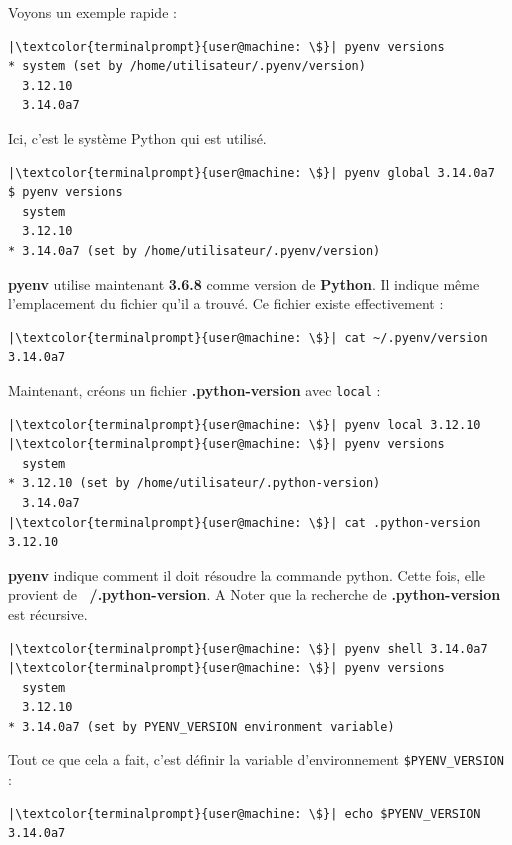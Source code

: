 Voyons un exemple rapide :
\begin{lstlisting}[style=terminal]
|\textcolor{terminalprompt}{user@machine: \$}| pyenv versions
* system (set by /home/utilisateur/.pyenv/version)
  3.12.10
  3.14.0a7
\end{lstlisting}

Ici, c'est le système Python qui est utilisé.
\begin{lstlisting}[style=terminal]
|\textcolor{terminalprompt}{user@machine: \$}| pyenv global 3.14.0a7
$ pyenv versions
  system
  3.12.10
* 3.14.0a7 (set by /home/utilisateur/.pyenv/version)
\end{lstlisting}

\textbf{pyenv} utilise maintenant \textbf{3.6.8} comme version de \textbf{Python}. Il indique même l'emplacement du fichier qu'il a trouvé. Ce fichier existe effectivement :
\begin{lstlisting}[style=terminal]
|\textcolor{terminalprompt}{user@machine: \$}| cat ~/.pyenv/version
3.14.0a7
\end{lstlisting}

Maintenant, créons un fichier \textbf{.python-version} avec \texttt{local} :
\begin{lstlisting}[style=terminal]
|\textcolor{terminalprompt}{user@machine: \$}| pyenv local 3.12.10
|\textcolor{terminalprompt}{user@machine: \$}| pyenv versions
  system
* 3.12.10 (set by /home/utilisateur/.python-version)
  3.14.0a7
|\textcolor{terminalprompt}{user@machine: \$}| cat .python-version
3.12.10
\end{lstlisting}

\textbf{pyenv} indique comment il doit résoudre la commande python. Cette fois, elle provient de \textbf{~/.python-version}. A Noter que la recherche de \textbf{.python-version} est récursive.
\begin{lstlisting}[style=terminal]
|\textcolor{terminalprompt}{user@machine: \$}| pyenv shell 3.14.0a7
|\textcolor{terminalprompt}{user@machine: \$}| pyenv versions
  system
  3.12.10
* 3.14.0a7 (set by PYENV_VERSION environment variable)
\end{lstlisting}

Tout ce que cela a fait, c'est définir la variable d'environnement \texttt{\$PYENV\_VERSION} :
\begin{lstlisting}[style=terminal]
|\textcolor{terminalprompt}{user@machine: \$}| echo $PYENV_VERSION
3.14.0a7
\end{lstlisting}

